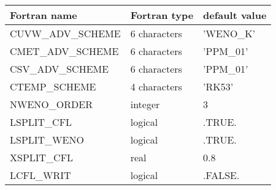 \begin{center}
\begin{tabular} {|l|l|l|}
\hline
Fortran name & Fortran type & default value \\
\hline
CUVW\_ADV\_SCHEME   &  6 characters  & 'WENO\_K'   \\
CMET\_ADV\_SCHEME    &  6 characters  & 'PPM\_01'   \\
CSV\_ADV\_SCHEME    &  6 characters  & 'PPM\_01'   \\
CTEMP\_SCHEME    &  4 characters  & 'RK53'   \\
NWENO\_ORDER    &  integer       & 3   \\
LSPLIT\_CFL   &  logical       & .TRUE.   \\
LSPLIT\_WENO   &  logical       & .TRUE.   \\
XSPLIT\_CFL   &  real          & 0.8      \\
LCFL\_WRIT  &  logical       & .FALSE.   \\
\hline
\end{tabular}
\end{center}


